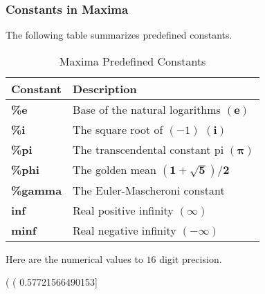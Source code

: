 \documentclass[11pt]{article}
\begin{document}
\subsubsection*{Constants in Maxima}
The following table summarizes predefined constants.
\begin{table}[h]
\begin{center}
  \begin{tabular}{|ll|}
    \hline
    Constant & Description \\ \hline
	\textbf{\%e} & Base of the natural logarithms $\mathbf{(e)}$ \\
	\textbf{\%i}  & The square root of $(-1)$ \; $\mathbf{(i)}$ \\
	\textbf{\%pi}  & The transcendental constant pi $\boldsymbol{(\pi)}$    \\
    \textbf{\%phi}&  The golden mean $\boldsymbol{(1+\sqrt{5})/2}$   \\
	\textbf{\%gamma} & The Euler-Mascheroni constant \\
	\textbf{inf} & Real positive infinity $\mathbf{(\infty)}$ \\
	\textbf{minf} & Real negative infinity $\mathbf{(-\infty)}$  \\ \hline
	\end{tabular}  
\caption{Maxima Predefined Constants}
\end{center}
\end{table}

\noindent Here are the numerical values to $16$ digit precision.
\begin{myVerbatim}
(%
(%
                                                              0.57721566490153]
\end{myVerbatim}
\end{document}
